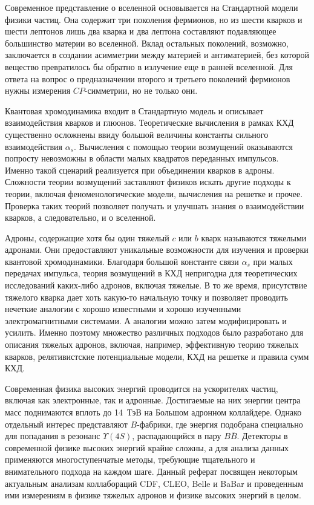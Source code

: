 \documentclass[a4paper, 12pt]{article}
\def\-{\nobreakdash-\hspace{0pt}}
\begin{document}
Современное представление о вселенной основывается на Стандартной модели 
физики частиц. Она содержит три поколения фермионов, но из шести кварков 
и шести лептонов лишь два кварка и два лептона составляют подавляющее 
большинство материи во вселенной. Вклад остальных поколений, возможно, 
заключается в создании асимметрии между материей и антиматерией, без 
которой вещество превратилось бы обратно в излучение еще в ранней 
вселенной. Для ответа на вопрос о предназначении второго и третьего 
поколений фермионов нужны измерения $CP$\-симметрии, но не только они.

Квантовая хромодинамика входит в Стандартную модель и описывает 
взаимодействия кварков и глюонов. Теоретические вычисления в рамках КХД 
существенно осложнены ввиду большой величины константы сильного 
взаимодействия $\alpha_s$. Вычисления с помощью теории возмущений 
оказываются попросту невозможны в области малых квадратов переданных 
импульсов. Именно такой сценарий реализуется при объединении кварков 
в адроны. Сложности теории возмущений заставляют физиков искать другие 
подходы к теории, включая феноменологические модели, вычисления на 
решетке и прочее. Проверка таких теорий позволяет получать и улучшать 
знания о взаимодействии кварков, а следовательно, и о вселенной.

Адроны, содержащие хотя бы один тяжелый $c$ или $b$ кварк называются 
тяжелыми адронами. Они предоставляют уникальные возможности для изучения 
и проверки квантовой хромодинамики.
%
Благодаря большой константе связи $\alpha_s$ при малых передачах 
импульса, теория возмущений в КХД непригодна для теоретических 
исследований каких-либо адронов, включая тяжелые.
%
В то же время, присутствие тяжелого кварка дает хоть какую-то начальную 
точку и позволяет проводить нечеткие аналогии с хорошо известными 
и хорошо изученными электромагнитными системами. А аналогии можно затем 
модифицировать и усилить.
%
Именно поэтому множество различных подходов было разработано для 
описания тяжелых адронов, включая, например, эффективную теорию тяжелых 
кварков, релятивистские потенциальные модели, КХД на решетке и правила 
сумм КХД.

Современная физика высоких энергий проводится на ускорителях частиц, 
включая как электронные, так и адронные. Достигаемые на них энергии 
центра масс поднимаются вплоть до 14~ТэВ на Большом адронном коллайдере. 
Однако отдельный интерес представляют $B$-фабрики, где энергия подобрана 
специально для попадания в резонанс $\Upsilon(4S)$, распадающийся в пару 
$B\bar{B}$. Детекторы в современной физике высоких энергий крайне 
сложны, а для анализа данных применяются многоступенчатые методы, 
требующие тщательного и внимательного подхода на каждом шаге. Данный 
реферат посвящен некоторым актуальным анализам коллабораций CDF, CLEO, 
Belle и BaBar и проведенным ими измерениям в физике тяжелых адронов 
и физике высоких энергий в целом.
\end{document}
